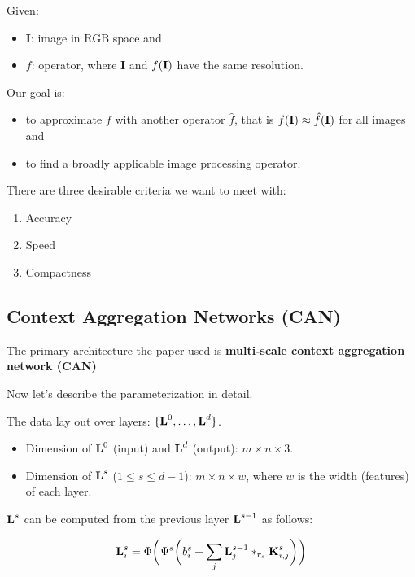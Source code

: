 \documentclass{article}
\newcommand{\tb}{\textbf}
\begin{document}
Given:

\begin{itemize}
    \item \tb I: image in RGB space and
    \item $f$: operator, where \tb{I} and $f(\tb I)$ have the same resolution.
\end{itemize}

Our goal is:

\begin{itemize}
    \item to approximate $f$ with another operator $\hat f$, that is $f(\tb I) \approx \hat f(\tb I)$ for all images and
    \item to find a broadly applicable image processing operator.
\end{itemize}

There are three desirable criteria we want to meet with:

\begin{enumerate}
    \item Accuracy
    \item Speed
    \item Compactness
\end{enumerate}

\subsection*{Context Aggregation Networks (CAN)}

The primary architecture the paper used is \tb{multi-scale context aggregation network (CAN)}

Now let's describe the parameterization in detail.

The data lay out over layers: $\{\tb L^0, \dots, \tb L^d\}$.

\begin{itemize}
    \item Dimension of $\tb L^0$ (input) and $\tb L^d$ (output): $m \times n \times 3$.
    \item Dimension of $\tb L^s$ ($1 \le s \le d - 1$): $m \times n \times w$, where $w$ is the width (features) of each layer.
\end{itemize}

$\tb L^s$ can be computed from the previous layer $\tb L^{s - 1}$ as follows:

$$\tb L_i^s = \Phi\bigg( \Psi^s \bigg(b_i^s + \sum\limits_j \tb L_j^{s - 1} *_{r_s} \tb K_{i, j}^s \bigg)\bigg)$$
\end{document}
